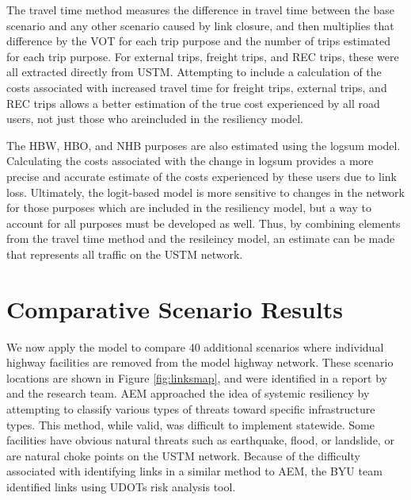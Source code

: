 The travel time method measures the difference in travel time between the base
scenario and any other scenario caused by link closure, and then multiplies that
difference by the VOT for each trip purpose and the number of trips estimated for
each trip purpose. For external trips, freight trips, and REC trips, these were all
extracted directly from USTM. Attempting to include a calculation of the costs
associated with increased travel time for freight trips, external trips, and REC
trips allows a better estimation of the true cost experienced by all road users, not
just those who areincluded in the resiliency model.

The HBW, HBO, and NHB purposes are also estimated using the logsum model. Calculating
the costs associated with the change in logsum provides a more precise and accurate
estimate of the costs experienced by these users due to link loss. Ultimately, the
logit-based model is more sensitive to changes in the network for those purposes
which are included in the resiliency model, but a way to account for all purposes
must be developed as well. Thus, by combining elements from the travel time method
and the resileincy model, an estimate can be made that represents all traffic on the
USTM network.

\section{Comparative Scenario Results}

We now apply the model to compare 40 additional scenarios where individual highway
facilities are removed from the model highway network. These scenario locations are
shown in Figure \ref{fig:linksmap}, and were identified in a report by \cite{aem2017} and the research team. AEM approached
the idea of systemic resiliency by attempting to classify various types of threats
toward specific infrastructure types. This method, while valid, was difficult to
implement statewide. Some facilities have obvious natural threats such as earthquake,
flood, or landslide, or are natural choke points on the USTM network. Because of the difficulty
associated with identifying links in a similar method to AEM, the BYU team identified links using UDOTs risk analysis tool.

